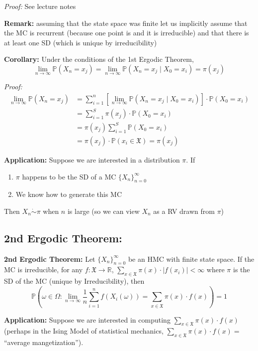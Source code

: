 \documentclass[12pt]{article}
\renewcommand{\P}{\mathbb{P}}
\newcommand{\R}{\mathbb{R}}
\newcommand{\mfX}{\mathfrak{X}}
\begin{document}
        \emph{Proof:} See lecture notes

        \textbf{Remark:} assuming that the state space was finite let us implicitly assume that the MC is recurrent (because one point is and it is irreducible) and that there is at least one SD (which is unique by irreducibility)

        \textbf{Corollary:} Under the conditions of the 1st Ergodic Theorem, 
        \[\lim_{n\to \infty} \P(X_n = x_j)  = \lim_{n\to \infty} \P(X_n = x_j \; | \; X_0 = x_i) = \pi(x_j)\]

        \emph{Proof:}
        \begin{align*}
            \lim_{n\to \infty} \P(X_n = x_j) &= \sum_{i=1}^n \left[\lim_{n\to\infty} \P(X_n = x_j \; | \; X_0 = x_i)\right] \cdot \P(X_0 = x_i)\\
            &=\sum_{i=1}^S \pi(x_j) \cdot \P(X_0 = x_i) \\
            &= \pi(x_j) \sum_{i=1}^S \P(X_0 = x_i)\\
            &= \pi(x_j) \cdot \P(x_i \in \mfX) = \pi(x_j)
        \end{align*}
        
        \textbf{Application:} Suppose we are interested in a distribution $\pi.$ If 
        \begin{enumerate}
            \item $\pi$ happens to be the SD of a MC $\{X_n\}_{n=0}^\infty$ 
            \item We know how to generate this MC
        \end{enumerate}
        Then $X_n \dot \sim  \pi$ when $n$ is large (so we can view $X_n$ as a RV drawn from $\pi$)

    \subsection{2nd Ergodic Theorem:} 
        \textbf{2nd Ergodic Theorem:} Let $\{X_n\}_{n=0}^\infty$ be an HMC with finite state space. If the MC is irreducible, for any $f: \mfX \to \R$, 
        $\sum_{x\in \mfX} \pi(x) \cdot \big\vert f(x_i)\big\vert < \infty$ where $\pi$ is the SD of the MC (unique by Irreducibility), then 
        \[\P\left(\omega \in \Omega: \lim_{n\to \infty} \frac{1}{n}\sum_{i=1}^n f(X_i(\omega)) = \sum_{x \in \mfX} \pi(x) \cdot f(x)\right) = 1\]

        \textbf{Application:} Suppose we are interested in computing $\sum_{x\in \mfX} \pi(x) \cdot f(x)$ (perhaps in the Ising Model of statistical mechanics, $\sum_{x\in \mfX} \pi(x) \cdot f(x) =$ ``average mangetization'').
\end{document}
